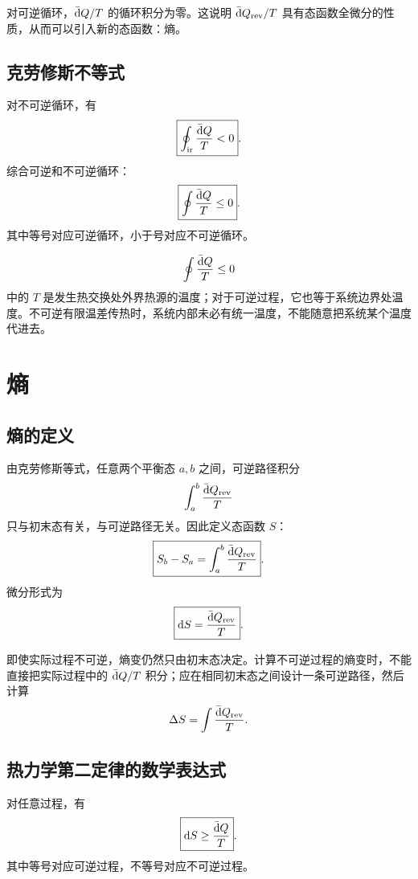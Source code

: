 \begin{KeyBox}[克劳修斯等式的意义]
对可逆循环，\(\mathop{}\!\bar{\mathrm{d}} Q/T\) 的循环积分为零。这说明 \(\mathop{}\!\bar{\mathrm{d}} Q_{\mathrm{rev}}/T\) 具有态函数全微分的性质，从而可以引入新的态函数：熵。
\end{KeyBox}

\subsection{克劳修斯不等式}

对不可逆循环，有
\[
  \boxed{
  \oint_{\mathrm{ir}}\frac{\mathop{}\!\bar{\mathrm{d}} Q}{T}<0
  }.
\]
综合可逆和不可逆循环：
\[
  \boxed{
  \oint\frac{\mathop{}\!\bar{\mathrm{d}} Q}{T}\le 0
  }.
\]
其中等号对应可逆循环，小于号对应不可逆循环。

\begin{WarnBox}[克劳修斯不等式中的 \(T\)]
\[
  \oint\frac{\mathop{}\!\bar{\mathrm{d}} Q}{T}\le0
\]
中的 \(T\) 是发生热交换处外界热源的温度；对于可逆过程，它也等于系统边界处温度。不可逆有限温差传热时，系统内部未必有统一温度，不能随意把系统某个温度代进去。
\end{WarnBox}

\section{熵}

\subsection{熵的定义}

由克劳修斯等式，任意两个平衡态 \(a,b\) 之间，可逆路径积分
\[
  \int_a^b\frac{\mathop{}\!\bar{\mathrm{d}} Q_{\mathrm{rev}}}{T}
\]
只与初末态有关，与可逆路径无关。因此定义态函数 \(S\)：
\[
  \boxed{
  S_b-S_a
  =
  \int_a^b\frac{\mathop{}\!\bar{\mathrm{d}} Q_{\mathrm{rev}}}{T}
  }.
\]
微分形式为
\[
  \boxed{
  \mathop{}\!\mathrm{d} S=\frac{\mathop{}\!\bar{\mathrm{d}} Q_{\mathrm{rev}}}{T}
  }.
\]

\begin{WarnBox}
即使实际过程不可逆，熵变仍然只由初末态决定。计算不可逆过程的熵变时，不能直接把实际过程中的 \(\mathop{}\!\bar{\mathrm{d}} Q/T\) 积分；应在相同初末态之间设计一条可逆路径，然后计算
\[
  \Delta S=\int\frac{\mathop{}\!\bar{\mathrm{d}} Q_{\mathrm{rev}}}{T}.
\]
\end{WarnBox}

\subsection{热力学第二定律的数学表达式}

对任意过程，有
\[
  \boxed{
  \mathop{}\!\mathrm{d} S\ge \frac{\mathop{}\!\bar{\mathrm{d}} Q}{T}
  }.
\]
其中等号对应可逆过程，不等号对应不可逆过程。

